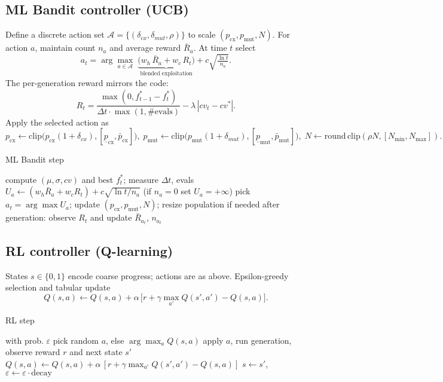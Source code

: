 \documentclass[12pt,a4paper]{article}
\begin{document}
\subsection{ML Bandit controller (UCB)}
Define a discrete action set $\mathcal{A}=\{(\delta_{cx},\delta_{mut},\rho)\}$ to scale $(p_{\text{cx}},p_{\text{mut}},N)$. For action $a$, maintain count $n_a$ and average reward $\bar{R}_a$. At time $t$ select
\[ a_t = \arg\max_{a\in\mathcal{A}}\; \underbrace{\big(w_h\,\bar{R}_a + w_c\,R_t\big)}_{\text{blended exploitation}} + c\sqrt{\tfrac{\ln t}{n_a}}. \]
The per-generation reward mirrors the code:
\[ R_t = \frac{\max(0, f^*_{t-1}-f^*_t)}{\Delta t \cdot \max(1,\#\text{evals})} - \lambda\,|cv_t - cv^*|. \]
Apply the selected action as
\[ p_{\text{cx}} \leftarrow \mathrm{clip}\big(p_{\text{cx}}(1+\delta_{cx}),[\underline{p}_{\text{cx}},\bar{p}_{\text{cx}}]\big),\; p_{\text{mut}} \leftarrow \mathrm{clip}\big(p_{\text{mut}}(1+\delta_{mut}),[\underline{p}_{\text{mut}},\bar{p}_{\text{mut}}]\big),\; N\leftarrow \mathrm{round}\,\mathrm{clip}(\rho N,[N_{\min},N_{\max}]). \]

\begin{algorithm}[H]
\caption{ML Bandit step}
\begin{algorithmic}[1]
\State compute $(\mu,\sigma,cv)$ and best $f^*_t$; measure $\Delta t$, evals
\State $U_a \leftarrow (w_h\bar{R}_a + w_c R_t) + c\sqrt{\ln t / n_a}$ (if $n_a=0$ set $U_a=+\infty$)
\EndFor
\State pick $a_t=\arg\max U_a$; update $(p_{\text{cx}},p_{\text{mut}},N)$; resize population if needed
\State after generation: observe $R_t$ and update $\bar{R}_{a_t}$, $n_{a_t}$
\end{algorithmic}
\end{algorithm}

\subsection{RL controller (Q-learning)}
States $s\in\{0,1\}$ encode coarse progress; actions are as above. Epsilon-greedy selection and tabular update
\[ Q(s,a) \leftarrow Q(s,a) + \alpha\,\big[ r + \gamma \max_{a'} Q(s',a') - Q(s,a)\big]. \]
\begin{algorithm}[H]
\caption{RL step}
\begin{algorithmic}[1]
\State with prob. $\varepsilon$ pick random $a$, else $\arg\max_a Q(s,a)$
\State apply $a$, run generation, observe reward $r$ and next state $s'$
\State $Q(s,a)\leftarrow Q(s,a)+\alpha\,[r+\gamma\max_{a'}Q(s',a')-Q(s,a)]$
\State $s\leftarrow s'$, $\varepsilon\leftarrow \varepsilon\cdot\text{decay}$
\end{algorithmic}
\end{algorithm}
\end{document}
